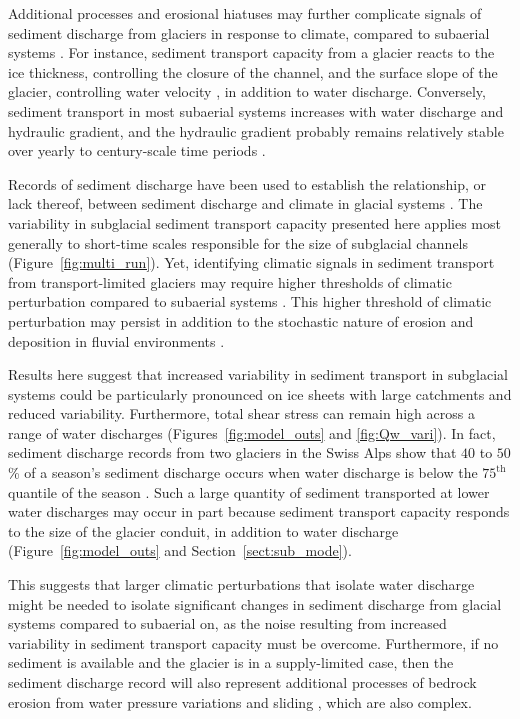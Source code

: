 \documentclass[11pt]{article}
\begin{document}
Additional processes and erosional hiatuses may further complicate signals of sediment discharge from glaciers in response to climate, compared to subaerial systems \citep{jansson2005,ganti2016}. 
For instance, sediment transport capacity from a glacier reacts to the ice thickness, controlling the closure of the channel, and the surface slope of the glacier, controlling water velocity \citep[Section~\ref{sect:sub_mode}; ][]{rothlisberger1972,shreve1972,delaney2022,stevens2022}, in addition to water discharge.
Conversely, sediment transport in most subaerial systems increases with water discharge and hydraulic gradient, and the hydraulic gradient probably remains relatively stable over yearly to century-scale time periods \citep[Section~\ref{sect:fluv}; e.g.][]{muller1968,whipple1999,wong2006,wickert2019}. 

Records of sediment discharge have been used to establish the relationship, or lack thereof, between sediment discharge and climate in glacial systems \citep[e.g.][]{koppes2009a,willenbring2016,mariotti2021}.
The variability in subglacial sediment transport capacity presented here applies most generally to short-time scales responsible for the size of subglacial channels (Figure~\ref{fig:multi_run}).
Yet, identifying climatic signals in sediment transport from transport-limited glaciers may require higher thresholds of climatic perturbation compared to subaerial systems \citep{tofelde2021}.
This higher threshold of climatic perturbation may persist in addition to the stochastic nature of erosion and deposition in fluvial environments \citep{castletort2003,jerolmack2010,romans2016}.

Results here suggest that increased variability in sediment transport in subglacial systems  could be particularly pronounced on ice sheets with large catchments and reduced variability.
Furthermore, total shear stress can remain high across a range of water discharges (Figures~\ref{fig:model_outs} and \ref{fig:Qw_vari}).
In fact, sediment discharge records from two glaciers in the Swiss Alps show that $40$ to $50$\% of a season's sediment discharge occurs when water discharge is below the $75^{\mathrm{th}}$ quantile of the season \citep{delaney2018}.
Such a large quantity of sediment transported at lower water discharges may occur in part because sediment transport capacity responds to the size of the glacier conduit, in addition to water discharge (Figure~\ref{fig:model_outs} and Section~\ref{sect:sub_mode}).

This suggests that larger climatic perturbations that isolate  water discharge might be needed to isolate significant changes in sediment discharge from glacial systems compared to subaerial on, as the noise resulting from increased variability in sediment transport capacity must be overcome.
Furthermore, if no sediment is available and the glacier is in a supply-limited case, then the sediment discharge record will also represent additional processes of bedrock erosion from  water pressure variations and sliding  \citep{iverson2012,herman2015}, which are also complex.
\end{document}
